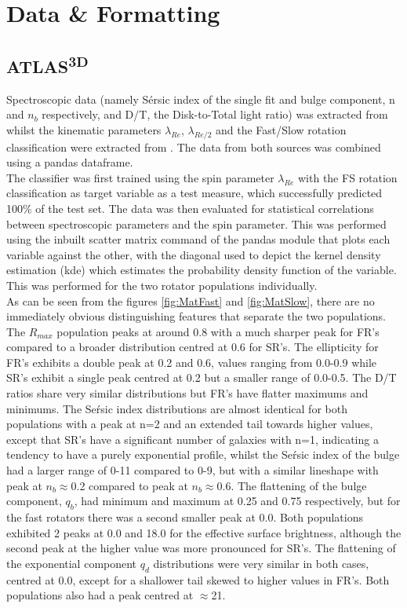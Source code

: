 \section{Data \& Formatting}
\subsection{ATLAS\textsuperscript{3D}}
Spectroscopic data (namely S\'ersic index of the single fit and bulge component, n and $n_{b}$ respectively,  and D/T, the Disk-to-Total light ratio) was extracted from \cite{Krajnovic2013} whilst the kinematic parameters $\lambda_{Re}$, $\lambda_{Re/2}$ and the Fast/Slow rotation classification were extracted from \cite{Emsellem2011}. The data from both sources was combined using a pandas dataframe.\\
The classifier was first trained using the spin parameter $\lambda_{Re}$ with the FS rotation classification as target variable as a test measure, which successfully predicted 100\% of the test set. The data was then evaluated for statistical correlations between spectroscopic parameters and the spin parameter. This was performed using the inbuilt scatter matrix command of the pandas module that plots each variable against the other, with the diagonal used to depict the kernel density estimation (kde) which estimates the probability density function of the variable. This was performed for the two rotator populations individually.\\As can be seen from the figures \ref{fig:MatFast} and \ref{fig:MatSlow}, there are no immediately obvious distinguishing features that separate the two populations. The $R_{max}$ population peaks at around 0.8 with a much sharper peak for FR's compared to a broader distribution centred at 0.6 for SR's. The ellipticity for FR's exhibits a double peak at 0.2 and 0.6, values ranging from 0.0-0.9 while SR's exhibit a single peak centred at 0.2 but a smaller range of 0.0-0.5. The D/T ratios share very similar distributions but FR's have flatter maximums and minimums. The Se\'rsic index distributions are almost identical for both populations with a peak at n=2 and an extended tail towards higher values, except that SR's have a significant number of galaxies with n=1, indicating a tendency to have a purely exponential profile, whilst the Se\'rsic index of the bulge had a larger range of 0-11 compared to 0-9, but with a similar lineshape with peak at $n_{b}\approx$0.2 compared to peak at $n_{b}\approx$0.6. The flattening of the bulge component, $q_{b}$, had minimum and maximum at 0.25 and 0.75 respectively, but for the fast rotators there was a second smaller peak at 0.0. Both populations exhibited 2 peaks at 0.0 and 18.0 for the effective surface brightness, although the second peak at the higher value was more pronounced for SR's. The flattening of the exponential component $q_{d}$ distributions were very similar in both cases, centred at 0.0, except for a shallower tail skewed to higher values in FR's. Both populations also had a peak centred at $\approx$21. \\
